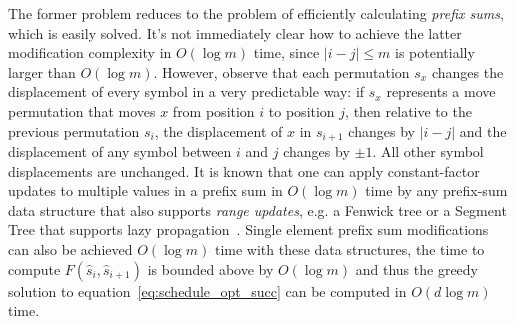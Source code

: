 \documentclass{siamart190516}
\DeclareMathOperator*{\argmin}{arg\,min}
\begin{document}
The former problem reduces to the problem of efficiently calculating \emph{prefix sums}, which is easily solved. It's not immediately clear how to achieve the latter modification complexity in $O(\log m)$ time, since $\lvert i - j \rvert \leq m$ is potentially larger than $O(\log m)$. However, observe that each permutation $s_x$ changes the displacement of every symbol in a very predictable way: if $s_x$ represents a move permutation that moves $x$ from position $i$ to position $j$, then relative to the previous permutation $s_{i}$, the displacement of $x$ in $s_{i+1}$ changes by $\lvert i - j \rvert$ and the displacement of any symbol between $i$ and $j$ changes by $\pm 1$. All other symbol displacements are unchanged.  
It is known that one can apply constant-factor updates to multiple values in a prefix sum in $O(\log m)$ time by any prefix-sum data structure that also supports \emph{range updates}, e.g. a Fenwick tree or a Segment Tree that supports lazy propagation~\cite{de1997computational}. Single element prefix sum modifications can also be achieved $O(\log m)$ time with these data structures, the time to compute $F(\hat{s}_i, \hat{s}_{i+1})$ is bounded above by $O(\log m)$ and thus the greedy solution to equation~\ref{eq:schedule_opt_succ} can be computed in $O(d \log m)$ time. 
%
%
\end{document}
